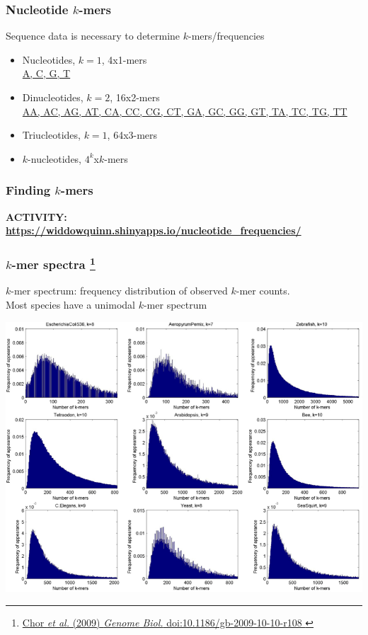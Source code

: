 %
\begin{frame}
  \frametitle{Nucleotide $k$-mers}
  Sequence data is necessary to determine $k$-mers/frequencies
  \begin{itemize}
    \item \textcolor{hutton_green}{Nucleotides, $k=1$, 4x1-mers} \\
      \url{A, C, G, T}
    \item \textcolor{hutton_blue}{Dinucleotides, $k=2$, 16x2-mers} \\
      \url{AA, AC, AG, AT, CA, CC, CG, CT, GA, GC, GG, GT, TA, TC, TG, TT}
    \item \textcolor{RawSienna}{Triucleotides, $k=1$, 64x3-mers}
    \item \textcolor{hutton_purple}{$k$-nucleotides, $4^k$x$k$-mers}
  \end{itemize}  
\end{frame}

%
\begin{frame}
  \frametitle{Finding $k$-mers}
  \Large{
    \textcolor{hutton_blue}{
      \textbf{
      ACTIVITY: \\
      \small{
        \href{https://widdowquinn.shinyapps.io/nucleotide_frequencies/}{https://widdowquinn.shinyapps.io/nucleotide\_frequencies/}
        }
      }
    }
  }
\end{frame}

%
\begin{frame}
  \frametitle{$k$-mer spectra
  \footnote{\tiny{\href{http://dx.doi.org/10.1186/gb-2009-10-10-r108
}{Chor \textit{et al.} (2009) \textit{Genome Biol.} doi:10.1186/gb-2009-10-10-r108
}}}
  }
  \textcolor{RawSienna}{$k$-mer spectrum: frequency distribution of observed $k$-mer counts.} \\
  Most species have a unimodal $k$-mer spectrum
  \begin{center}
    \includegraphics[height=0.6\textheight]{images/kmer_spectra} \\
  \end{center}  
\end{frame}
